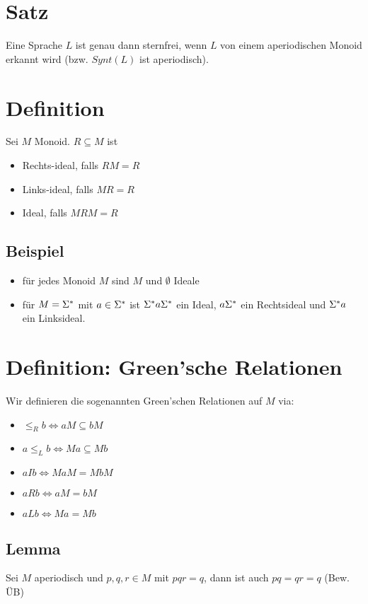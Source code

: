 \section{Satz}
    Eine Sprache $L$ ist genau dann sternfrei, wenn $L$ von einem aperiodischen Monoid erkannt wird (bzw. $Synt(L)$ ist aperiodisch).
\section{Definition}
    Sei $M$ Monoid. $R\subseteq M$ ist
    \begin{itemize}
        \item Rechts-ideal, falls $RM=R$
        \item Links-ideal, falls $MR=R$
        \item Ideal, falls $MRM=R$
    \end{itemize}
    \subsection{Beispiel}
        \begin{itemize}
            \item für jedes Monoid $M$ sind $M$ und $\emptyset$ Ideale
            \item für $M=\Sigma^*$ mit $a\in\Sigma^*$ ist $\Sigma^* a\Sigma^*$ ein Ideal, $a\Sigma^*$ ein Rechtsideal und $\Sigma^* a$ ein Linksideal.
        \end{itemize}
\section{Definition: Green'sche Relationen}
    Wir definieren die sogenannten Green'schen Relationen auf $M$ via:
    \begin{itemize}
        \item $\le_R b\Leftrightarrow aM\subseteq bM$
        \item $a\le_L b\Leftrightarrow Ma\subseteq Mb$
        \item $aIb\Leftrightarrow MaM=MbM$
        \item $aRb\Leftrightarrow aM=bM$
        \item $aLb\Leftrightarrow Ma=Mb$
    \end{itemize}
    \subsection{Lemma}
        \label{sub:sch-lemma-1}
        Sei $M$ aperiodisch und $p,q,r\in M$ mit $pqr=q$, dann ist auch $pq=qr=q$ (Bew. ÜB)
